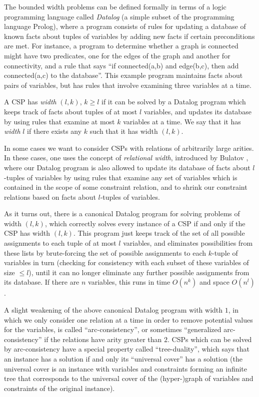 \documentclass[letterpaper,11pt]{article}
\begin{document}
The bounded width problems can be defined formally in terms of a logic programming language called \emph{Datalog} (a simple subset of the programming language Prolog), where a program consists of rules for updating a database of known facts about tuples of variables by adding new facts if certain preconditions are met. For instance, a program to determine whether a graph is connected might have two predicates, one for the edges of the graph and another for connectivity, and a rule that says ``if connected(a,b) and edge(b,c), then add connected(a,c) to the database''. This example program maintains facts about pairs of variables, but has rules that involve examining three variables at a time.

\begin{defn} A CSP has \emph{width} $(l,k)$, $k \ge l$ if it can be solved by a Datalog program which keeps track of facts about tuples of at most $l$ variables, and updates its database by using rules that examine at most $k$ variables at a time. We say that it has \emph{width} $l$ if there exists any $k$ such that it has width $(l,k)$.
\end{defn}

In some cases we want to consider CSPs with relations of arbitrarily large arities. In these cases, one uses the concept of \emph{relational width}, introduced by Bulatov \cite{2-semilattice}, where our Datalog program is also allowed to update its database of facts about $l$-tuples of variables by using rules that examine any set of variables which is contained in the scope of some constraint relation, and to shrink our constraint relations based on facts about $l$-tuples of variables.

As it turns out, there is a canonical Datalog program for solving problems of width $(l,k)$, which correctly solves every instance of a CSP if and only if the CSP has width $(l,k)$. This program just keeps track of the set of all possible assignments to each tuple of at most $l$ variables, and eliminates possibilities from these lists by brute-forcing the set of possible assignments to each $k$-tuple of variables in turn (checking for consistency with each subset of these variables of size $\le l$), until it can no longer eliminate any further possible assignments from its database. If there are $n$ variables, this runs in time $O(n^k)$ and space $O(n^l)$.

A slight weakening of the above canonical Datalog program with width $1$, in which we only consider one relation at a time in order to remove potential values for the variables, is called ``arc-consistency'', or sometimes ``generalized arc-consistency'' if the relations have arity greater than $2$. CSPs which can be solved by arc-consistency have a special property called ``tree-duality'', which says that an instance has a solution if and only its ``universal cover'' has a solution (the universal cover is an instance with variables and constraints forming an infinite tree that corresponds to the universal cover of the (hyper-)graph of variables and constraints of the original instance).
\end{document}
